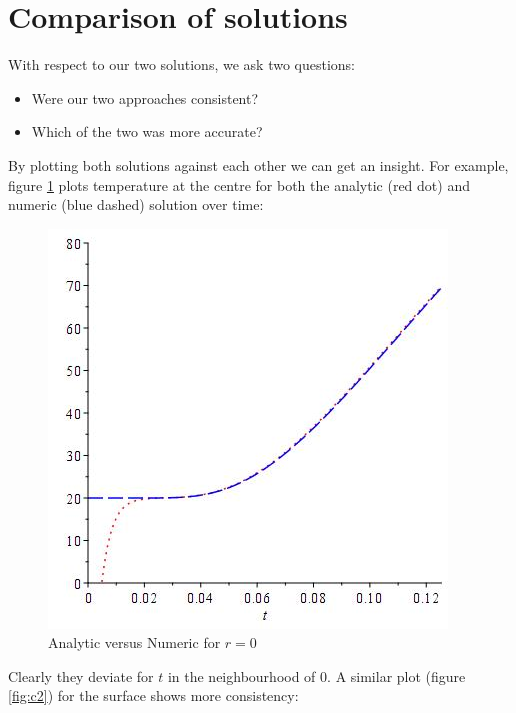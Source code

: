 \documentclass{report}
\begin{document}
\section{Comparison of solutions}

With respect to our two solutions, we ask two questions:\bigskip 

\begin{itemize}

\item Were our two approaches consistent?

\item Which of the two was more accurate?

\end{itemize}\medskip

By plotting both solutions against each other we can get an insight. For example, figure \ref{fig:c1} plots temperature at 
the centre for both the analytic (red dot) and numeric (blue dashed) solution over time:\bigskip

\begin{figure}[h]
\centering
\includegraphics[scale = 0.25]{compare-01}
\caption{Analytic versus Numeric for $r = 0$}
\label{fig:c1}
\end{figure}

Clearly they deviate for $t$ in the neighbourhood of $0$. A similar plot (figure \ref{fig:c2}) for the surface shows more 
consistency:\bigskip
\end{document}
